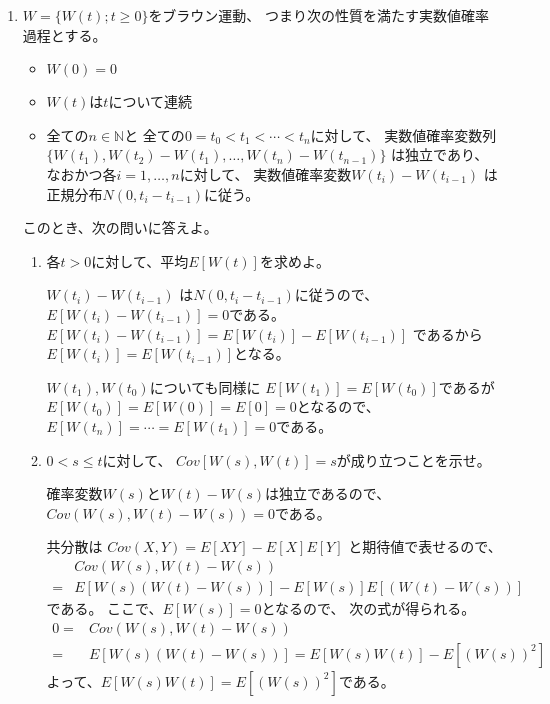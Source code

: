 \documentclass[12pt,b5paper]{ltjsarticle}
\begin{document}
\begin{enumerate}
 \item
      $W=\{ W(t);t\geq0\}$をブラウン運動、
      つまり次の性質を満たす実数値確率過程とする。
      \begin{itemize}
       \item
            $W(0)=0$
       \item
            $W(t)$は$t$について連続
       \item
            全ての$n\in\mathbb{N}$と
            全ての$0=t_0<t_1<\cdots<t_n$に対して、
            実数値確率変数列
            $\{W(t_1),W(t_2)-W(t_1),\dots,W(t_n)-W(t_{n-1})\}$
            は独立であり、
            なおかつ各$i=1,\dots,n$に対して、
            実数値確率変数$W(t_i)-W(t_{i-1})$
            は正規分布$N(0,t_i-t_{i-1})$に従う。
      \end{itemize}

      このとき、次の問いに答えよ。
      \begin{enumerate}
       \item 各$t>0$に対して、平均$E[W(t)]$を求めよ。

             \dotfill

             $W(t_i)-W(t_{i-1})$
             は$N(0,t_i-t_{i-1})$に従うので、
             $E[W(t_i)-W(t_{i-1})]=0$である。
             $E[W(t_i)-W(t_{i-1})]=E[W(t_i)]-E[W(t_{i-1})]$
             であるから
             $E[W(t_i)]=E[W(t_{i-1})]$となる。

             $W(t_{1}),W(t_{0})$についても同様に
             $E[W(t_{1})]=E[W(t_{0})]$であるが
             $E[W(t_{0})]=E[W(0)]=E[0]=0$となるので、
             $E[W(t_{n})]=\cdots=E[W(t_{1})]=0$である。

             \hrulefill

       \item $0<s\leq t$に対して、
             $Cov[W(s),W(t)]=s$が成り立つことを示せ。

             \dotfill

             確率変数$W(s)$と$W(t)-W(s)$は独立であるので、
             $Cov(W(s),W(t)-W(s))=0$である。

             共分散は
             $Cov(X,Y) = E[XY]-E[X]E[Y]$
             と期待値で表せるので、
             \begin{align}
               & Cov(W(s),W(t)-W(s))\\
               = & E[W(s)(W(t)-W(s))]
               -E[W(s)]E[(W(t)-W(s))]
             \end{align}
             である。
             ここで、$E[W(s)]=0$となるので、
             次の式が得られる。
             \begin{align}
              0=&
              Cov(W(s),W(t)-W(s))\\
               =& E[W(s)(W(t)-W(s))]
               =E[W(s)W(t)]-E[(W(s))^2]
             \end{align}
             よって、$E[W(s)W(t)]=E[(W(s))^2]$である。


\end{enumerate}
\end{enumerate}
\end{document}
